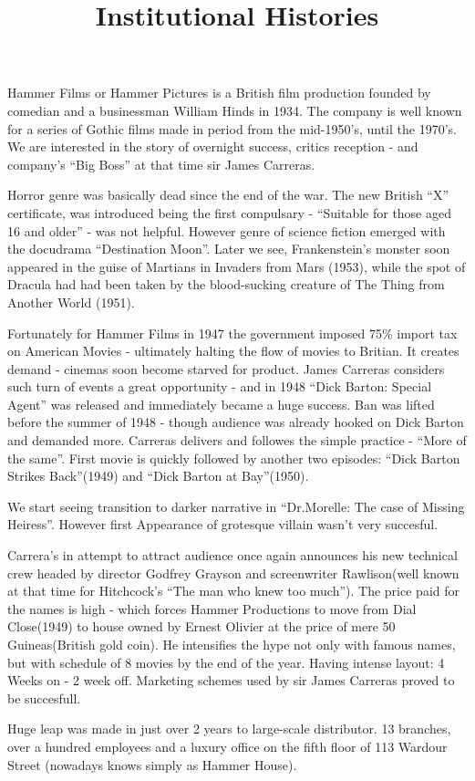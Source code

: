 \documentclass{article}
\title{Institutional Histories}
\begin{document}
\makeheader

Hammer Films or Hammer Pictures is a British film
production founded by comedian and a businessman William
Hinds in 1934. The company is well known for a series of
Gothic films made in period from the mid-1950's, until
the 1970's. We are interested in the story of overnight
success, critics reception - and company's ``Big Boss''
at that time sir James Carreras.  

Horror genre was basically dead since the end of the war.
The new British ``X'' certificate, was introduced being
the first compulsary - ``Suitable for those aged 16 and
older'' - was not helpful. However genre of science
fiction emerged with the docudrama ``Destination Moon''.
Later we see, Frankenstein’s monster soon appeared in the guise of Martians in Invaders
from Mars (1953), while the spot of Dracula had
had been taken by the blood-sucking creature of
The Thing from Another World (1951).  

Fortunately for Hammer Films in 1947 the government
imposed 75\% import tax on American Movies - ultimately
halting the flow of movies to Britian. It creates demand -
cinemas soon become starved for product. James Carreras
considers such turn of events a great opportunity - and
in 1948 ``Dick Barton: Special Agent'' was released and
immediately became a huge success. Ban was lifted before
the summer of 1948 - though audience was already hooked on
Dick Barton and demanded more. Carreras delivers
and followes the simple practice - ``More of the same''.
First movie is quickly followed by another two episodes: 
``Dick Barton Strikes Back''(1949) and ``Dick Barton at
Bay''(1950).  

We start seeing transition to darker narrative in
``Dr.Morelle: The case of Missing Heiress''. However
first Appearance of grotesque villain wasn't very
succesful.  

Carrera's in attempt to attract audience once again
announces his new technical crew headed by director
Godfrey Grayson and screenwriter Rawlison(well known
at that time for Hitchcock's ``The man who knew too
much''). The price paid for the names is high - which
forces Hammer Productions to move from Dial Close(1949)
to house owned by Ernest Olivier at the price of mere
50 Guineas(British gold coin). He intensifies the hype
not only with famous names, but with schedule of 8 movies
by the end of the year. Having intense layout:
4 Weeks on - 2 week off. Marketing schemes used by sir
James Carreras proved to be succesfull.

Huge leap was made in just over 2 years to large-scale
distributor. 13 branches, over a hundred employees and a
luxury office on the fifth floor of 113 Wardour Street
(nowadays knows simply as Hammer House).

\makeworkscited
\end{document}
